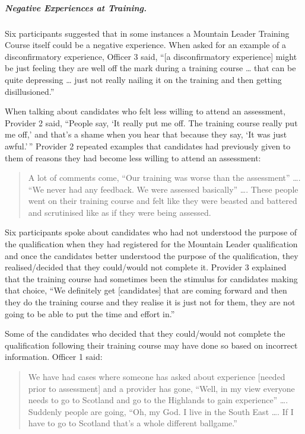 \documentclass[
  12pt,
  a4paper,
]{book}
\begin{document}
\hypertarget{negative-experiences-at-training.}{%
\subparagraph{Negative Experiences at Training.}\label{negative-experiences-at-training.}}

Six participants suggested that in some instances a Mountain Leader Training Course itself could be a negative experience. When asked for an example of a disconfirmatory experience, Officer 3 said, ``{[}a disconfirmatory experience{]} might be just feeling they are well off the mark during a training course \ldots{} that can be quite depressing \ldots{} just not really nailing it on the training and then getting disillusioned.''

When talking about candidates who felt less willing to attend an assessment, Provider 2 said, ``People say, `It really put me off. The training course really put me off,' and that's a shame when you hear that because they say, `It was just awful.'\,'' Provider 2 repeated examples that candidates had previously given to them of reasons they had become less willing to attend an assessment:

\begin{quote}
A lot of comments come, ``Our training was worse than the assessment'' \ldots. ``We never had any feedback. We were assessed basically'' \ldots. These people went on their training course and felt like they were beasted and battered and scrutinised like as if they were being assessed.
\end{quote}

Six participants spoke about candidates who had not understood the purpose of the qualification when they had registered for the Mountain Leader qualification and once the candidates better understood the purpose of the qualification, they realised/decided that they could/would not complete it. Provider 3 explained that the training course had sometimes been the stimulus for candidates making that choice, ``We definitely get {[}candidates{]} that are coming forward and then they do the training course and they realise it is just not for them, they are not going to be able to put the time and effort in.''

Some of the candidates who decided that they could/would not complete the qualification following their training course may have done so based on incorrect information. Officer 1 said:

\begin{quote}
We have had cases where someone has asked about experience {[}needed prior to assessment{]} and a provider has gone, ``Well, in my view everyone needs to go to Scotland and go to the Highlands to gain experience'' \ldots. Suddenly people are going, ``Oh, my God. I live in the South East \ldots. If I have to go to Scotland that's a whole different ballgame.''
\end{quote}
\end{document}
